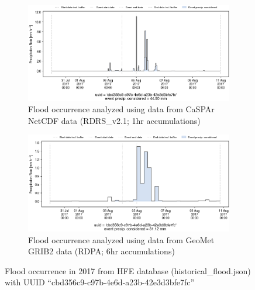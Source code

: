 \documentclass[10pt,a4paper,titlepage,parskip]{scrartcl}
\begin{document}
\begin{figure}[h]
	\begin{subfigure}[a]{1.0\textwidth}
		\centering
		\includegraphics[width=\linewidth]{figures/compare_Geomet_CaSPAr/interpolated_at_stations_occurrence_1534_identified-timesteps_RDRS_v2.1.png}
		\caption{Flood occurrence analyzed using data from CaSPAr NetCDF data (RDRS\_v2.1; 1hr accumulations)}
	\end{subfigure}
	\par\bigskip\bigskip
	\begin{subfigure}[b]{1.0\textwidth}
		\centering
		\includegraphics[width=\linewidth]{figures/compare_Geomet_CaSPAr/interpolated_at_stations_occurrence_1534_identified-timesteps_rdpa:10km:6f.png}
		\caption{Flood occurrence analyzed using data from GeoMet GRIB2 data (RDPA; 6hr accumulations)}
	\end{subfigure}
	\par\bigskip\bigskip
	\caption{Flood occurrence in 2017 from HFE database (historical\_flood.json) with UUID ``cbd356c9-c97b-4e6d-a23b-42e3d3bfe7fc''}
\end{figure}
\pagebreak
\end{document}
